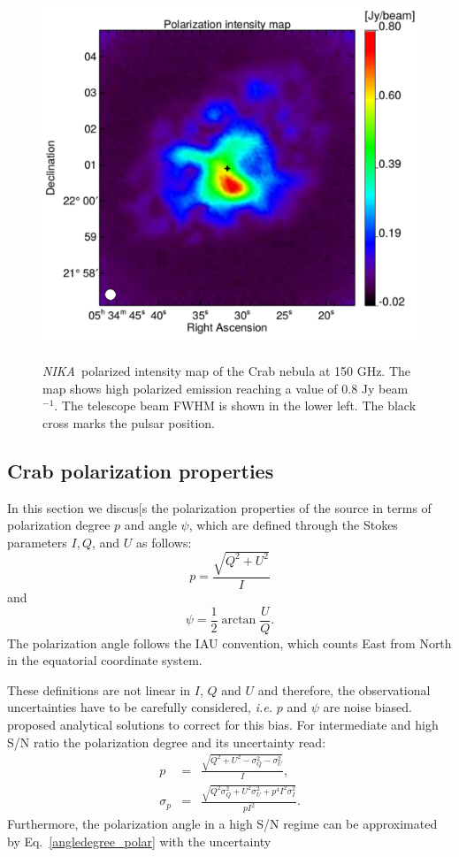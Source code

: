 \documentclass[twocolumn,traditabstract]{aa}
\def\NIKA{\textit{NIKA}}
\begin{document}
 \begin{figure}
  \centering
      {\includegraphics[width=0.75\linewidth,keepaspectratio]{figures/Crab_ipol_v3_2mm.pdf}}
\caption{\NIKA\ polarized intensity map of the  Crab nebula at 150 GHz. The map shows high polarized emission reaching a value of 0.8 Jy beam$^{-1}$. The telescope beam FWHM is shown in the lower left. The black cross marks the pulsar position.}
\label{crab_ipol_maps}		
  \end{figure}

\subsection{Crab polarization properties}\label{sec:pol_properties}
In this section we discus[s the polarization properties of the source in terms of polarization degree $p$ and angle $\psi$, which are defined through the Stokes parameters $I, Q$, and $U$ as follows:
\begin{equation}
 p    = \frac{\sqrt{Q^2 + U^2}}{I} \nonumber 
\end{equation}
and
 \begin{equation}
 \psi = \frac{1}{2}\arctan\frac{U}{Q}.\label{angledegree_polar}
 \end{equation}
The polarization angle follows the IAU convention, which counts East from North in the equatorial coordinate system.

These definitions are not linear in $I$, $Q$ and $U$ and therefore, the observational uncertainties have to be carefully considered, {\it i.e.} $p$ and $\psi$ are noise biased. 
\citet{1980A&A....91...97S,1985A&A...142..100S,montier} proposed analytical solutions to correct for this bias. For intermediate and high S/N ratio the polarization degree and its uncertainty read:
 \begin{eqnarray}
 p    &=& \frac{\sqrt{Q^2 + U^2 - \sigma_{Q}^2 - \sigma_{U}^2}}{I}, \nonumber \\ 
  \sigma_{p} &=& \frac{\sqrt{Q^2\sigma_Q^2 + U^2\sigma_U^2 + p^4I^2\sigma_I^2}}{pI^2}.
  \label{p_true_degree}
 \end{eqnarray}
Furthermore, the polarization angle in a high S/N regime can be approximated by Eq.~\ref{angledegree_polar} with the uncertainty
 
\end{document}
